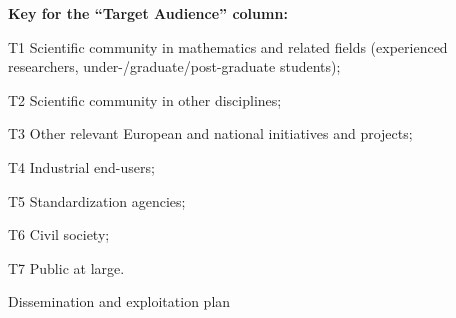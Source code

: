 \begin{table}
\smallskip
{\bf Key for the ``Target Audience'' column:}
\begin{compactenum}
\item[T1] Scientific community in mathematics and related fields 
     (experienced researchers, under-/graduate/post-graduate students);
\item[T2] Scientific community in other disciplines;
\item[T3] Other relevant European and national initiatives and projects;
\item[T4] Industrial end-users;
\item[T5] Standardization agencies;
\item[T6] Civil society;
\item[T7] Public at large.
\end{compactenum}
\caption{\label{table:dissem-plan}Dissemination and exploitation plan}
\end{table}

